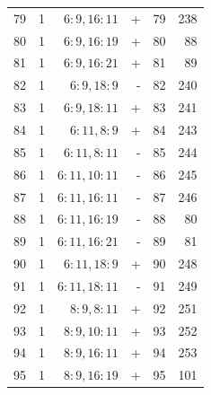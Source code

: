 \begin{center}
\begin{tabular}{rrrrrr}
79 & 1 & $6:9,16:11$ & + & 79 & 238\\
80 & 1 & $6:9,16:19$ & + & 80 & 88\\
81 & 1 & $6:9,16:21$ & + & 81 & 89\\
82 & 1 & $6:9,18:9$ & - & 82 & 240\\
83 & 1 & $6:9,18:11$ & + & 83 & 241\\
84 & 1 & $6:11,8:9$ & + & 84 & 243\\
85 & 1 & $6:11,8:11$ & - & 85 & 244\\
86 & 1 & $6:11,10:11$ & - & 86 & 245\\
87 & 1 & $6:11,16:11$ & - & 87 & 246\\
88 & 1 & $6:11,16:19$ & - & 88 & 80\\
89 & 1 & $6:11,16:21$ & - & 89 & 81\\
90 & 1 & $6:11,18:9$ & + & 90 & 248\\
91 & 1 & $6:11,18:11$ & - & 91 & 249\\
92 & 1 & $8:9,8:11$ & + & 92 & 251\\
93 & 1 & $8:9,10:11$ & + & 93 & 252\\
94 & 1 & $8:9,16:11$ & + & 94 & 253\\
95 & 1 & $8:9,16:19$ & + & 95 & 101\\
\bottomrule\end{tabular}\end{center}\clearpage
